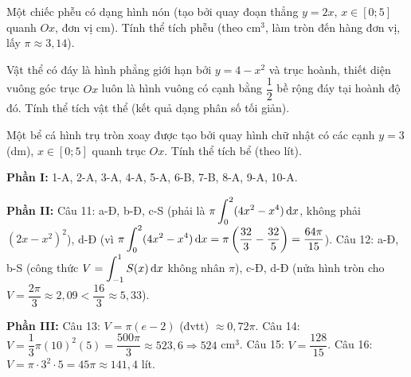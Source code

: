 \cauhoi Một chiếc phễu có dạng hình nón (tạo bởi quay đoạn thẳng $y=2x$, $x\in[0;5]$ quanh $Ox$, đơn vị cm). Tính thể tích phễu (theo cm$^3$, làm tròn đến hàng đơn vị, lấy $\pi\approx3{,}14$).

\cauhoi Vật thể có đáy là hình phẳng giới hạn bởi $y=4-x^2$ và trục hoành, thiết diện vuông góc trục $Ox$ luôn là hình vuông có cạnh bằng $\dfrac12$ bề rộng đáy tại hoành độ đó. Tính thể tích vật thể (kết quả dạng phân số tối giản).

\cauhoi Một bể cá hình trụ tròn xoay được tạo bởi quay hình chữ nhật có các cạnh $y=3$ (dm), $x\in[0;5]$ quanh trục $Ox$. Tính thể tích bể (theo lít).

\clearpage
\begin{hopchuy}[Đáp án]
\textbf{Phần I:} 1-A, 2-A, 3-A, 4-A, 5-A, 6-B, 7-B, 8-A, 9-A, 10-A.

\textbf{Phần II:} Câu 11: a-Đ, b-Đ, c-S (phải là $\pi\displaystyle\int_0^2(4x^2-x^4)\,\mathrm{d}x$, không phải $(2x-x^2)^2$), d-Đ (vì $\pi\displaystyle\int_0^2(4x^2-x^4)\,\mathrm{d}x=\pi\left(\dfrac{32}{3}-\dfrac{32}{5}\right)=\dfrac{64\pi}{15}$). \quad Câu 12: a-Đ, b-S (công thức $V=\displaystyle\int_{-1}^1 S(x)\,\mathrm{d}x$ không nhân $\pi$), c-Đ, d-Đ (nửa hình tròn cho $V=\dfrac{2\pi}{3}\approx2{,}09 < \dfrac{16}{3}\approx5{,}33$).

\textbf{Phần III:} Câu 13: $V=\pi(e-2)$ (đvtt) $\approx0{,}72\pi$. \quad Câu 14: $V=\dfrac13\pi(10)^2(5)=\dfrac{500\pi}{3}\approx523{,}6\Rightarrow524$ cm$^3$. \quad Câu 15: $V=\dfrac{128}{15}$. \quad Câu 16: $V=\pi\cdot3^2\cdot5=45\pi\approx141{,}4$ lít.
\end{hopchuy}

\newpage
